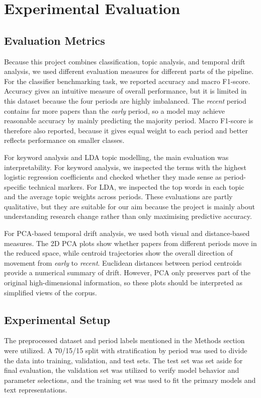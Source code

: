 \documentclass[11pt]{article}
\begin{document}
\section{Experimental Evaluation}

\subsection{Evaluation Metrics}

Because this project combines classification, topic analysis, and temporal drift analysis, we used different evaluation measures for different parts of the pipeline. For the classifier benchmarking task, we reported accuracy and macro F1-score. Accuracy gives an intuitive measure of overall performance, but it is limited in this dataset because the four periods are highly imbalanced. The \textit{recent} period contains far more papers than the \textit{early} period, so a model may achieve reasonable accuracy by mainly predicting the majority period. Macro F1-score is therefore also reported, because it gives equal weight to each period and better reflects performance on smaller classes.

For keyword analysis and LDA topic modelling, the main evaluation was interpretability. For keyword analysis, we inspected the terms with the highest logistic regression coefficients and checked whether they made sense as period-specific technical markers. For LDA, we inspected the top words in each topic and the average topic weights across periods. These evaluations are partly qualitative, but they are suitable for our aim because the project is mainly about understanding research change rather than only maximising predictive accuracy.

For PCA-based temporal drift analysis, we used both visual and distance-based measures. The 2D PCA plots show whether papers from different periods move in the reduced space, while centroid trajectories show the overall direction of movement from \textit{early} to \textit{recent}. Euclidean distances between period centroids provide a numerical summary of drift. However, PCA only preserves part of the original high-dimensional information, so these plots should be interpreted as simplified views of the corpus.

\subsection{Experimental Setup}

The preprocessed dataset and period labels mentioned in the Methods section were utilized. A 70/15/15 split with stratification by period was used to divide the data into training, validation, and test sets. The test set was set aside for final evaluation, the validation set was utilized to verify model behavior and parameter selections, and the training set was used to fit the primary models and text representations.
\end{document}
